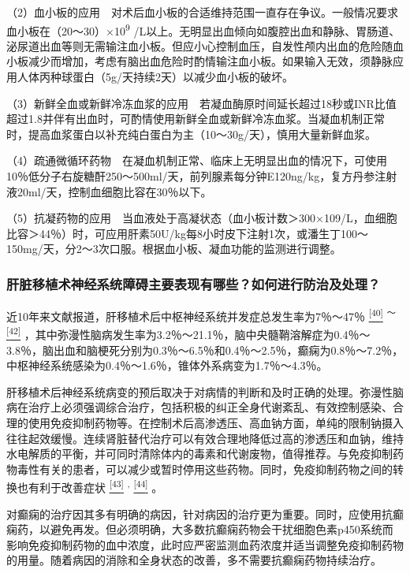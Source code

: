（2）血小板的应用　对术后血小板的合适维持范围一直存在争议。一般情况要求血小板在（20～30）×10\textsuperscript{9}
/L以上。无明显出血倾向如腹腔出血和静脉、胃肠道、泌尿道出血等则无需输注血小板。但应小心控制血压，自发性颅内出血的危险随血小板减少而增加，考虑有脑出血危险时酌情输注血小板。如果输入无效，须静脉应用人体丙种球蛋白（5g/天持续2天）以减少血小板的破坏。

（3）新鲜全血或新鲜冷冻血浆的应用　若凝血酶原时间延长超过18秒或INR比值超过1.8并伴有出血时，可酌情使用新鲜全血或新鲜冷冻血浆。当凝血机制正常时，提高血浆蛋白以补充纯白蛋白为主（10～30g/天），慎用大量新鲜血浆。

（4）疏通微循环药物　在凝血机制正常、临床上无明显出血的情况下，可使用10％低分子右旋糖酐250～500ml/天，前列腺素每分钟E120ng/kg，复方丹参注射液20ml/天，控制血细胞比容在30％以下。

（5）抗凝药物的应用　当血液处于高凝状态（血小板计数＞300×109/L，血细胞比容＞44％）时，可应用肝素50U/kg每8小时皮下注射1次，或潘生丁100～150mg/天，分2～3次口服。根据血小板、凝血功能的监测进行调整。

\subsubsection{肝脏移植术神经系统障碍主要表现有哪些？如何进行防治及处理？}

近10年来文献报道，肝移植术后中枢神经系统并发症总发生率为7％～47％
\protect\hyperlink{text00020.htmlux5cux23ch40-19}{\textsuperscript{{[}40{]}}}
\textsuperscript{～}
\protect\hyperlink{text00020.htmlux5cux23ch42-19}{\textsuperscript{{[}42{]}}}
，其中弥漫性脑病发生率为3.2％～21.1％，脑中央髓鞘溶解症为0.4％～3.8％，脑出血和脑梗死分别为0.3％～6.5％和0.4％～2.5％，癫痫为0.8％～7.2％，中枢神经系统感染为0.4％～1.6％，锥体外系病变为1.7％～4.3％。

肝移植术后神经系统病变的预后取决于对病情的判断和及时正确的处理。弥漫性脑病在治疗上必须强调综合治疗，包括积极的纠正全身代谢紊乱、有效控制感染、合理的使用免疫抑制药物等。在控制术后高渗透压、高血钠方面，单纯的限制钠摄入往往起效缓慢。连续肾脏替代治疗可以有效合理地降低过高的渗透压和血钠，维持水电解质的平衡，并可同时清除体内的毒素和代谢废物，值得推荐。与免疫抑制药物毒性有关的患者，可以减少或暂时停用这些药物。同时，免疫抑制药物之间的转换也有利于改善症状
\protect\hyperlink{text00020.htmlux5cux23ch43-19}{\textsuperscript{{[}43{]}}}
\textsuperscript{,}
\protect\hyperlink{text00020.htmlux5cux23ch44-19}{\textsuperscript{{[}44{]}}}
。

对癫痫的治疗因其多有明确的病因，针对病因的治疗更为重要。同时，应使用抗癫痫药，以避免再发。但必须明确，大多数抗癫痫药物会干扰细胞色素p450系统而影响免疫抑制药物的血中浓度，此时应严密监测血药浓度并适当调整免疫抑制药物的用量。随着病因的消除和全身状态的改善，多不需要抗癫痫药物持续治疗。

